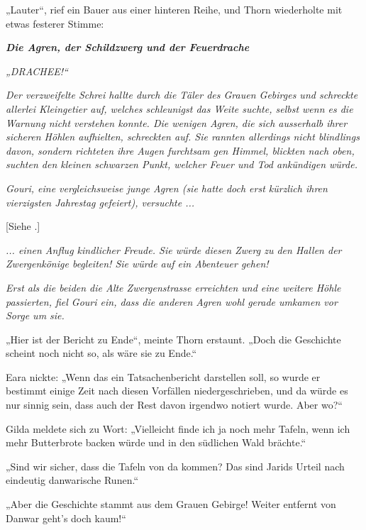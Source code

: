 „Lauter“, rief ein Bauer aus einer hinteren Reihe, und Thorn wiederholte mit etwas festerer Stimme:\bigskip



\textbf{\textit{Die Agren, der Schildzwerg und der Feuerdrache}}\bigskip



\textit{„DRACHEE!“}

\textit{Der verzweifelte Schrei hallte durch die Täler des Grauen Gebirges und schreckte allerlei Kleingetier auf, welches schleunigst das Weite suchte, selbst wenn es die Warnung nicht verstehen konnte. Die wenigen Agren, die sich ausserhalb ihrer sicheren Höhlen aufhielten, schreckten auf. Sie rannten allerdings nicht blindlings davon, sondern richteten ihre Augen furchtsam gen Himmel, blickten nach oben, suchten den kleinen schwarzen Punkt, welcher Feuer und Tod ankündigen würde.}

\textit{Gouri, eine vergleichsweise junge Agren (sie hatte doch erst kürzlich ihren vierzigsten Jahrestag gefeiert), versuchte ...}

[Siehe .]

\textit{... einen Anflug kindlicher Freude. Sie würde diesen Zwerg zu den Hallen der Zwergenkönige begleiten! Sie würde auf ein Abenteuer gehen!}

\textit{Erst als die beiden die Alte Zwergenstrasse erreichten und eine weitere Höhle passierten, fiel Gouri ein, dass die anderen Agren wohl gerade umkamen vor Sorge um sie.}\bigskip







„Hier ist der Bericht zu Ende“, meinte Thorn erstaunt. „Doch die Geschichte scheint noch nicht so, als wäre sie zu Ende.“

Eara nickte: „Wenn das ein Tatsachenbericht darstellen soll, so wurde er bestimmt einige Zeit nach diesen Vorfällen niedergeschrieben, und da würde es nur sinnig sein, dass auch der Rest davon irgendwo notiert wurde. Aber wo?“

Gilda meldete sich zu Wort: „Vielleicht finde ich ja noch mehr Tafeln, wenn ich mehr Butterbrote backen würde und in den südlichen Wald brächte.“

„Sind wir sicher, dass die Tafeln von da kommen? Das sind Jarids Urteil nach eindeutig danwarische Runen.“

„Aber die Geschichte stammt aus dem Grauen Gebirge! Weiter entfernt von Danwar geht’s doch kaum!“


